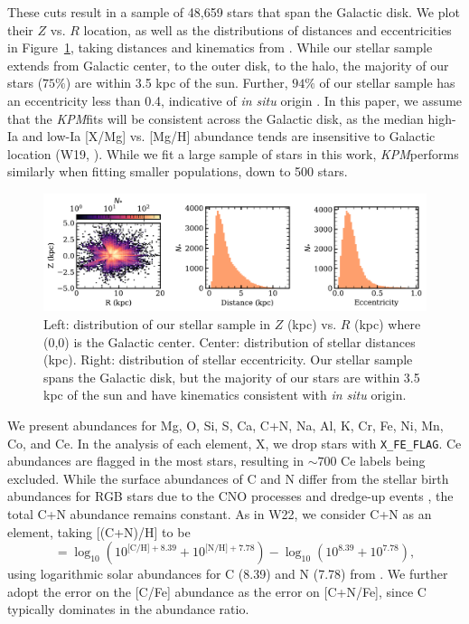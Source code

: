 \documentclass[modern]{aastex631}
\newcommand{\name}{\textsl{KPM}}
\begin{document}
These cuts result in a sample of 48,659 stars that span the Galactic disk. We plot their $Z$ vs. $R$ location, as well as the distributions of distances and eccentricities in Figure~\ref{fig:star_dist}, taking distances and kinematics from \citep{queiroz2023}. While our stellar sample extends from Galactic center, to the outer disk, to the halo, the majority of our stars ($75\%$) are within 3.5 kpc of the sun. Further, $94\%$ of our stellar sample has an eccentricity less than 0.4, indicative of \textit{in situ} origin \citep[e.g.,][]{sales2009}. In this paper, we assume that the \name fits will be consistent across the Galactic disk, as the median high-Ia and low-Ia [X/Mg] vs. [Mg/H] abundance tends are insensitive to Galactic location (W19, \citealp{griffith2021a}).  While we fit a large sample of stars in this work, \name performs similarly when fitting smaller populations, down to 500 stars.
\begin{figure}[htb!]
    \centering
    \includegraphics[width=\textwidth]{star_sample.pdf}
    \caption{Left: distribution of our stellar sample in $Z$ (kpc) vs. $R$ (kpc) where (0,0) is the Galactic center. Center: distribution of stellar distances (kpc). Right: distribution of stellar eccentricity. Our stellar sample spans the Galactic disk, but the majority of our stars are within 3.5 kpc of the sun and have kinematics consistent with \textit{in situ} origin.}
    \label{fig:star_dist}
\end{figure}

We present abundances for Mg, O, Si, S, Ca, C+N, Na, Al, K, Cr, Fe, Ni, Mn, Co, and Ce. In the analysis of each element, X, we drop stars with \texttt{X\_FE\_FLAG}. Ce abundances are flagged in the most stars, resulting in $\sim 700$ Ce labels being excluded. While the surface abundances of C and N differ from the stellar birth abundances for RGB stars due to the CNO processes and dredge-up events \citep{iben1965, shetrone2019}, the total C+N abundance remains constant. As in W22, we consider C+N as an element, taking [(C+N)/H] to be 
\begin{equation}
    [\text{C+N}/\text{H}] = \log_{10}(10^{\text{[C/H]}+8.39} + 10^{\text{[N/H]}+7.78}) - \log_{10}(10^{8.39} + 10^{7.78}),
\end{equation}
using logarithmic solar abundances for C (8.39) and N (7.78) from \citet{grevesse2007}. We further adopt the error on the [C/Fe] abundance as the error on [C+N/Fe], since C typically dominates in the abundance ratio.
\end{document}
